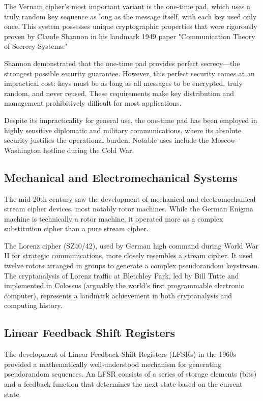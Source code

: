 \documentclass[12pt,a4paper,oneside]{report}
\begin{document}
The Vernam cipher's most important variant is the one-time pad, which uses a truly random key sequence as long as the message itself, with each key used only once. This system possesses unique cryptographic properties that were rigorously proven by Claude Shannon in his landmark 1949 paper "Communication Theory of Secrecy Systems."

Shannon demonstrated that the one-time pad provides perfect secrecy—the strongest possible security guarantee. However, this perfect security comes at an impractical cost: keys must be as long as all messages to be encrypted, truly random, and never reused. These requirements make key distribution and management prohibitively difficult for most applications.

Despite its impracticality for general use, the one-time pad has been employed in highly sensitive diplomatic and military communications, where its absolute security justifies the operational burden. Notable uses include the Moscow-Washington hotline during the Cold War.

\subsection{Mechanical and Electromechanical Systems}

The mid-20th century saw the development of mechanical and electromechanical stream cipher devices, most notably rotor machines. While the German Enigma machine is technically a rotor machine, it operated more as a complex substitution cipher than a pure stream cipher.

The Lorenz cipher (SZ40/42), used by German high command during World War II for strategic communications, more closely resembles a stream cipher. It used twelve rotors arranged in groups to generate a complex pseudorandom keystream. The cryptanalysis of Lorenz traffic at Bletchley Park, led by Bill Tutte and implemented in Colossus (arguably the world's first programmable electronic computer), represents a landmark achievement in both cryptanalysis and computing history.

\subsection{Linear Feedback Shift Registers}

The development of Linear Feedback Shift Registers (LFSRs) in the 1960s provided a mathematically well-understood mechanism for generating pseudorandom sequences. An LFSR consists of a series of storage elements (bits) and a feedback function that determines the next state based on the current state.
\end{document}
